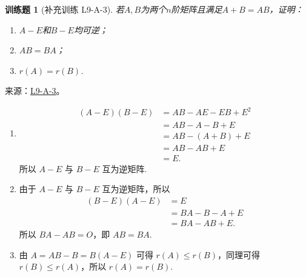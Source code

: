\documentclass[UTF8,12pt,a4paper,fontset=fandol]{ctexart}
\newtheorem{exercise}{训练题}[section]
\begin{document}
\begin{exercise}[补充训练 L9-A-3]\label{prob:L9-A-3}
若$A,B$为两个$n$阶矩阵且满足$A+B=AB$，证明：
        \begin{enumerate}
            \item $A-E$和$B-E$均可逆；

            \item $AB=BA$；

            \item $r(A)=r(B)$.
        \end{enumerate}
\end{exercise}
\noindent 来源：\href{https://github.com/yhwu-is/Linear-Algebra-Left-Undone/blob/new/%E8%AE%B2%E4%B9%89/%E4%B8%93%E9%A2%98/9%20%E7%9F%A9%E9%98%B5%E8%BF%90%E7%AE%97%E8%BF%9B%E9%98%B6.tex}{L9-A-3}。
\begin{solve}
\begin{enumerate}
                \item \begin{align*}
                          (A - E)(B - E) & = AB - AE - EB + E^2 \\
                                         & = AB - A - B + E     \\
                                         & = AB - (A + B) + E   \\
                                         & = AB - AB + E        \\
                                         & = E.
                      \end{align*}
                      所以 $ A - E $ 与 $ B - E $ 互为逆矩阵.

                \item 由于 $ A - E $ 与 $ B - E $ 互为逆矩阵，所以
                      \begin{align*}
                          (B - E)(A - E) & = E              \\
                                         & = BA - B - A + E \\
                                         & = BA - AB + E.
                      \end{align*}
                      所以 $ BA - AB = O $，即 $ AB = BA $.

                \item 由 $ A = AB - B = B(A - E) $ 可得 $ r(A) \leqslant r(B) $，同理可得 $ r(B) \leqslant r(A) $，所以 $ r(A) = r(B) $.
            \end{enumerate}
\end{solve}
\end{document}
